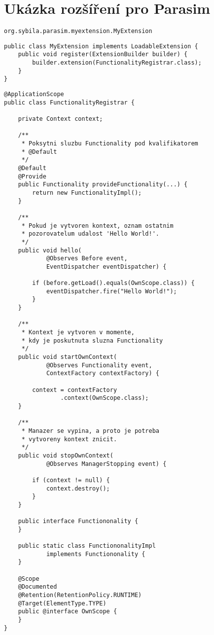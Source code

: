 \chapter{Ukázka rozšíření pro Parasim}\label{appendix:extension}

\begin{lstlisting}[caption={META-INF/services/org.sybila.parasim.core.spi.\\LoadableExtension}, style=Java]
org.sybila.parasim.myextension.MyExtension
\end{lstlisting}


\begin{lstlisting}[caption={org/sybila/parasim/myextension/MyExtension.java}, style=Java]
public class MyExtension implements LoadableExtension {
    public void register(ExtensionBuilder builder) {
        builder.extension(FunctionalityRegistrar.class);
    }
}
\end{lstlisting}

\begin{lstlisting}[caption={org/sybila/parasim/myextension/\\FunctionalityRegistrar.java}, style=Java]
@ApplicationScope
public class FunctionalityRegistrar {

	private Context context;
	
	/**
     * Poksytni sluzbu Functionality pod kvalifikatorem
     * @Default
     */
	@Default
	@Provide
    public Functionality provideFunctionality(...) {
        return new FunctionalityImpl();
    }

	/**
     * Pokud je vytvoren kontext, oznam ostatnim
     * pozorovatelum udalost 'Hello World!'.
     */
	public void hello(
			@Observes Before event,
			EventDispatcher eventDispatcher) {
	
		if (before.getLoad().equals(OwnScope.class)) {
			eventDispatcher.fire("Hello World!");
		}
	}

	/**
     * Kontext je vytvoren v momente,
     * kdy je poskutnuta sluzna Functionality
	 */
	public void startOwnContext(
			@Observes Functionality event,
			ContextFactory contextFactory) {
		
		context = contextFactory
				.context(OwnScope.class);
	}

	/**
     * Manazer se vypina, a proto je potreba
     * vytvoreny kontext znicit.
     */
	public void stopOwnContext(
			@Observes ManagerStopping event) {

		if (context != null) {
			context.destroy();
		}
	}

	public interface Functiononality {
	}

	public static class FunctiononalityImpl
			implements Functiononality {
	}

	@Scope
	@Documented
	@Retention(RetentionPolicy.RUNTIME)
	@Target(ElementType.TYPE)
	public @interface OwnScope {
	}
}
\end{lstlisting}
